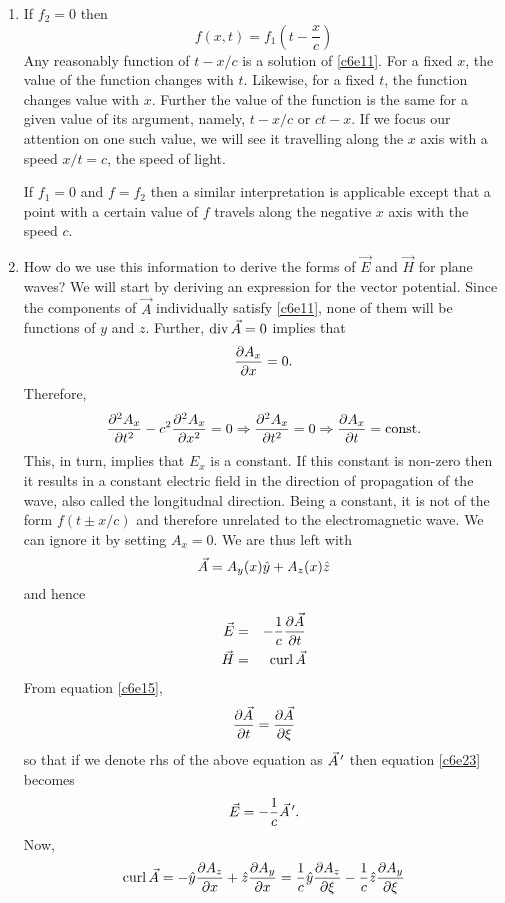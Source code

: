 \begin{enumerate}
\item If $f_2 = 0$ then
\[
f(x, t) = f_1\left(t - \frac{x}{c}\right)
\]
Any reasonably function of $t - x/c$ is a solution of \eqref{c6e11}. For a fixed
$x$, the value of the function changes with $t$. Likewise, for a fixed $t$, the
function changes value with $x$. Further the value of the function is the same
for a given value of its argument, namely, $t - x/c$ or $ct - x$. If we focus 
our attention on one such value, we will see it travelling along the $x$ axis 
with a speed $x/t = c$, the speed of light.

If $f_1 = 0$ and $f = f_2$ then a similar interpretation is applicable except
that a point with a certain value of $f$ travels along the negative $x$ axis
with the speed $c$.

\item How do we use this information to derive the forms of $\vec{E}$ and $\vec{H}$
for plane waves? We will start by deriving an expression for the vector potential.
Since the components of $\vec{A}$ individually satisfy \eqref{c6e11}, none of them
will be functions of $y$ and $z$. Further, $\operatorname{div}\vec{A} = 0$ implies that
\[
\frac{\partial{A_x}}{\partial{x}} = 0.
\]
Therefore,
\[
\frac{\partial^2{A_x}}{\partial{t}^2} - c^2\frac{\partial^2{A_x}}{\partial{x}^2} = 0 \Rightarrow \frac{\partial^2{A_x}}{\partial{t}^2} = 0
\Rightarrow \frac{\partial{A_x}}{\partial{t}} = \text{const.}
\]
This, in turn, implies that $E_x$ is a constant. If this constant is non-zero
then it results in a constant electric field in the direction of propagation
of the wave, also called the longitudnal direction. Being a constant, it is
not of the form $f(t \pm x/c)$ and therefore unrelated to the electromagnetic
wave. We can ignore it by setting $A_x = 0$. We are thus left with
\begin{equation}\label{c6e22}
\vec{A} = A_y(x)\hat{y} + A_z(x)\hat{z}
\end{equation}
and hence
\begin{eqnarray}
\vec{E} &=& -\frac{1}{c}\frac{\partial{\vec{A}}}{\partial{t}} \label{c6e23} \\
\vec{H} &=& \operatorname{curl}\vec{A} \label{c6e24}
\end{eqnarray}
From equation \eqref{c6e15},
\[
\frac{\partial{\vec{A}}}{\partial{t}} = \frac{\partial{\vec{A}}}{\partial{\xi}}
\]
so that if we denote rhs of the above equation as $\vec{A}^{\,\prime}$ then equation 
\eqref{c6e23} becomes
\begin{equation}\label{c6e25}
\vec{E} = -\frac{1}{c}\vec{A}^{\,\prime}.
\end{equation}
Now,
\begin{equation}\label{c6e26}
\curl\vec{A} = -\uv{y}\pdt{A_z}{x} + \uv{z}\pdt{A_y}{x} = 
\frac{1}{c}\uv{y}\pdt{A_z}{\xi} - \frac{1}{c}\uv{z}\pdt{A_y}{\xi}

\end{equation}
\end{enumerate}

